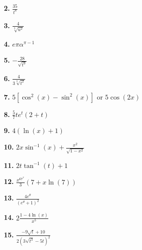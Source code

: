 \documentclass[12pt,]{book}
\theoremstyle{plain}
\theoremstyle{definition}
\numberwithin{equation}{section}
\newcommand{\fe}[2]{#1\mathopen{}\left(#2\right)\mathclose{}}
\begin{document}
                \par\smallskip
\noindent\textbf{2.}\quad{}
                    \(\frac{35}{t^8}\)%

                \par\smallskip
\noindent\textbf{3.}\quad{}
                    \(\frac{4}{\sqrt[3]{u^2}}\)%

                \par\smallskip
\noindent\textbf{4.}\quad{}
                    \(e\pi\alpha^{\pi-1}\)%

                \par\smallskip
\noindent\textbf{5.}\quad{}
                    \(-\frac{28}{\sqrt{t^{9}}}\)%

                \par\smallskip
\noindent\textbf{6.}\quad{}
                    \(\frac{4}{3\sqrt[3]{t^{2}}}\)%

                \par\smallskip
\noindent\textbf{7.}\quad{}
                    \(5\left[\fe{\cos^2}{x}-\fe{\sin^2}{x}\right]\) or \(5\fe{\cos}{2x}\)%

                \par\smallskip
\noindent\textbf{8.}\quad{}
                    \(\frac{5}{7}te^t(2+t)\)%

                \par\smallskip
\noindent\textbf{9.}\quad{}
                    \(4(\fe{\ln}{x}+1)\)%

                \par\smallskip
\noindent\textbf{10.}\quad{}
                    \(2x\fe{\sin^{-1}}{x}+\frac{x^2}{\sqrt{1-x^2}}\)%

                \par\smallskip
\noindent\textbf{11.}\quad{}
                    \(2t\fe{\tan^{-1}}{t}+1\)%

                \par\smallskip
\noindent\textbf{12.}\quad{}
                    \(\frac{x^67^x}{3}(7+x\fe{\ln}{7})\)%

                \par\smallskip
\noindent\textbf{13.}\quad{}
                    \(\frac{4e^{\theta}}{\left(e^\theta+1\right)^2}\)%

                \par\smallskip
\noindent\textbf{14.}\quad{}
                    \(2\frac{1-4\fe{\ln}{x}}{x^5}\)%

                \par\smallskip
\noindent\textbf{15.}\quad{}
                    \(\frac{-9\sqrt{t}+10}{2\left(3\sqrt{t^3}-5t\right)^2}\)%
\end{document}
